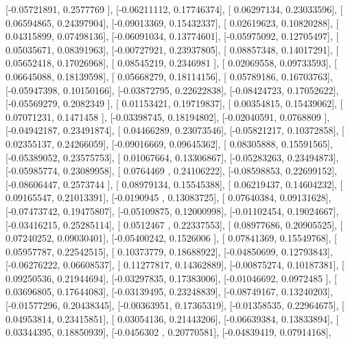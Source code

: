 \documentclass{article}
\begin{document}
       [-0.05721891,  0.2577769 ],
       [-0.06211112,  0.17746374],
       [ 0.06297134,  0.23033596],
       [ 0.06594865,  0.24397904],
       [-0.09013369,  0.15432337],
       [ 0.02619623,  0.10820288],
       [ 0.04315899,  0.07498136],
       [-0.06091034,  0.13774601],
       [-0.05975092,  0.12705497],
       [ 0.05035671,  0.08391963],
       [-0.00727921,  0.23937805],
       [ 0.08857348,  0.14017291],
       [ 0.05652418,  0.17026968],
       [ 0.08545219,  0.2346981 ],
       [ 0.02069558,  0.09733593],
       [ 0.06645088,  0.18139598],
       [ 0.05668279,  0.18114156],
       [ 0.05789186,  0.16703763],
       [-0.05947398,  0.10150166],
       [-0.03872795,  0.22622838],
       [-0.08424723,  0.17052622],
       [-0.05569279,  0.2082349 ],
       [ 0.01153421,  0.19719837],
       [ 0.00354815,  0.15439062],
       [ 0.07071231,  0.1471458 ],
       [-0.03398745,  0.18194802],
       [-0.02040591,  0.0768809 ],
       [-0.04942187,  0.23491874],
       [ 0.04466289,  0.23073546],
       [-0.05821217,  0.10372858],
       [ 0.02355137,  0.24266059],
       [-0.09016669,  0.09645362],
       [ 0.08305888,  0.15591565],
       [-0.05389052,  0.23575753],
       [ 0.01067664,  0.13306867],
       [-0.05283263,  0.23494873],
       [-0.05985774,  0.23089958],
       [ 0.0764469 ,  0.24106222],
       [-0.08598853,  0.22699152],
       [-0.08606447,  0.2573744 ],
       [ 0.08979134,  0.15545388],
       [ 0.06219437,  0.14604232],
       [ 0.09165547,  0.21013391],
       [-0.0190945 ,  0.13083725],
       [ 0.07640384,  0.09131628],
       [-0.07473742,  0.19475807],
       [-0.05109875,  0.12000998],
       [-0.01102454,  0.19024667],
       [-0.03416215,  0.25285114],
       [ 0.0512467 ,  0.22337553],
       [ 0.08977686,  0.20905525],
       [ 0.07240252,  0.09030401],
       [-0.05400242,  0.1526006 ],
       [ 0.07841369,  0.15549768],
       [ 0.05957787,  0.22542515],
       [ 0.10373779,  0.18688922],
       [-0.04850699,  0.12793843],
       [-0.06276222,  0.06608537],
       [ 0.11277817,  0.14362889],
       [-0.00875274,  0.10187381],
       [ 0.09250536,  0.21944694],
       [-0.03297835,  0.17383006],
       [-0.01046692,  0.0972485 ],
       [ 0.03696805,  0.17644083],
       [-0.03139495,  0.23248839],
       [-0.08749167,  0.13240203],
       [-0.01577296,  0.20438345],
       [-0.00363951,  0.17365319],
       [-0.01358535,  0.22964675],
       [ 0.04953814,  0.23415851],
       [ 0.03054136,  0.21443206],
       [-0.06639384,  0.13833894],
       [ 0.03344395,  0.18850939],
       [-0.0456302 ,  0.20770581],
       [-0.04839419,  0.07914168],
\end{document}
